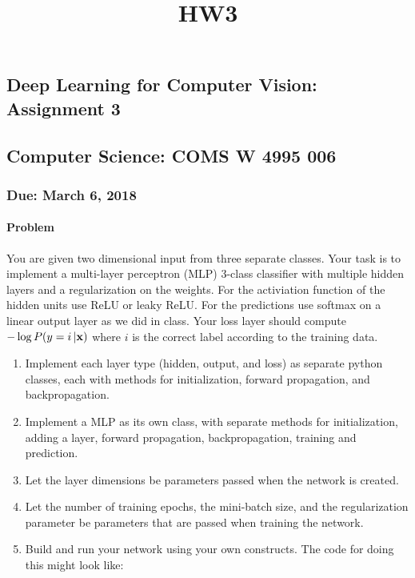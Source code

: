 \documentclass[11pt]{article}
\title{HW3}
\begin{document}
    
    
    \maketitle
    
    

    
    \subsection{Deep Learning for Computer Vision: Assignment
3}\label{deep-learning-for-computer-vision-assignment-3}

    \subsection{Computer Science: COMS W 4995
006}\label{computer-science-coms-w-4995-006}

    \subsubsection{Due: March 6, 2018}\label{due-march-6-2018}

    \paragraph{Problem}\label{problem}

    You are given two dimensional input from three separate classes. Your
task is to implement a multi-layer perceptron (MLP) 3-class classifier
with multiple hidden layers and a regularization on the weights. For the
activiation function of the hidden units use ReLU or leaky ReLU. For the
predictions use softmax on a linear output layer as we did in class.
Your loss layer should compute \(-\log P(y = i \,|{\bf x})\) where \(i\)
is the correct label according to the training data.

\begin{enumerate}
\def\labelenumi{\alph{enumi})}
\item
  Implement each layer type (hidden, output, and loss) as separate
  python classes, each with methods for initialization, forward
  propagation, and backpropagation.
\item
  Implement a MLP as its own class, with separate methods for
  initialization, adding a layer, forward propagation, backpropagation,
  training and prediction.
\item
  Let the layer dimensions be parameters passed when the network is
  created.
\item
  Let the number of training epochs, the mini-batch size, and the
  regularization parameter be parameters that are passed when training
  the network.
\item
  Build and run your network using your own constructs. The code for
  doing this might look like:
\end{enumerate}
\end{document}
